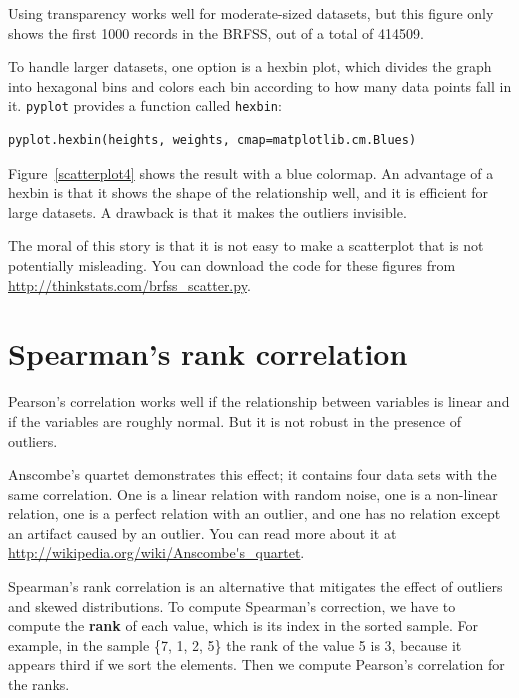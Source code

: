 \documentclass[12pt]{book}
\begin{document}
Using transparency works well for moderate-sized datasets, but this
figure only shows the first 1000 records in the BRFSS, out of a total
of 414509.

To handle larger datasets, one option is a hexbin plot, which divides
the graph into hexagonal bins and colors each bin according to how many
data points fall in it.  {\tt pyplot} provides a function called 
{\tt hexbin}:
%
\begin{verbatim}
pyplot.hexbin(heights, weights, cmap=matplotlib.cm.Blues)
\end{verbatim}
%
Figure~\ref{scatterplot4} shows the result with a blue colormap.
An advantage of a hexbin is that it shows the shape of the relationship
well, and it is efficient for large datasets.  A drawback is that
it makes the outliers invisible.

The moral of this story is that it is
not easy to make a scatterplot that is not potentially misleading.
You can download the code for these figures from
\url{http://thinkstats.com/brfss_scatter.py}.

\section{Spearman's rank correlation}

Pearson's correlation works well if the relationship between variables
is linear and if the variables are roughly normal.  But it is not
robust in the presence of outliers.

Anscombe's quartet demonstrates this effect; it contains four data
sets with the same correlation.  One is a linear relation with random
noise, one is a non-linear relation, one is a perfect relation with an
outlier, and one has no relation except an artifact caused by an
outlier.  You can read more about it at
\url{http://wikipedia.org/wiki/Anscombe's_quartet}.

Spearman's rank correlation is an alternative that mitigates the
effect of outliers and skewed distributions.  To compute Spearman's
correction, we have to compute the {\bf rank} of each value, which is its
index in the sorted sample.  For example, in the sample \{7, 1, 2, 5\}
the rank of the value 5 is 3, because it appears third if we sort
the elements.  Then we compute Pearson's correlation for the ranks.
\end{document}
